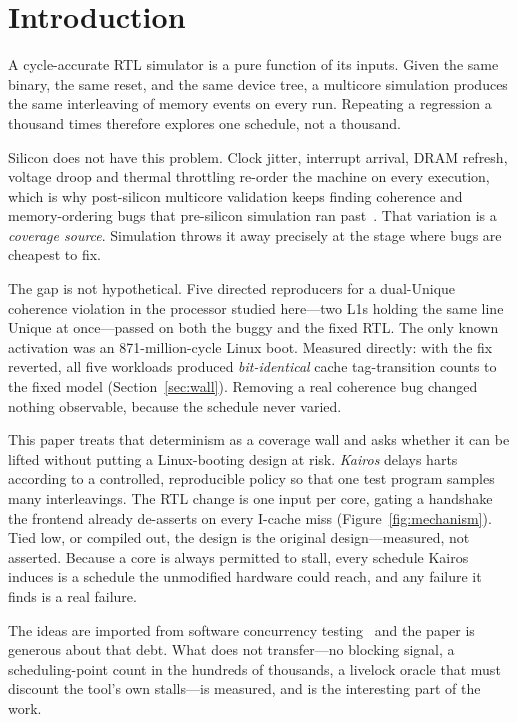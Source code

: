 \documentclass[sigconf,anonymous,review]{acmart}
\begin{document}
\maketitle

\section{Introduction}
\label{sec:intro}

A cycle-accurate RTL simulator is a pure function of its inputs. Given
the same binary, the same reset, and the same device tree, a multicore
simulation produces the same interleaving of memory events on every
run. Repeating a regression a thousand times therefore explores one
schedule, not a thousand.

Silicon does not have this problem. Clock jitter, interrupt arrival,
DRAM refresh, voltage droop and thermal throttling re-order the machine
on every execution, which is why post-silicon multicore validation
keeps finding coherence and memory-ordering bugs that pre-silicon
simulation ran past~\cite{hangal2004tsotool,lee2017mtracecheck}. That
variation is a \emph{coverage source}. Simulation throws it away
precisely at the stage where bugs are cheapest to fix.

The gap is not hypothetical. Five directed reproducers for a dual-Unique
coherence violation in the processor studied here---two L1s holding the
same line Unique at once---passed on both the buggy and the fixed RTL.
The only known activation was an 871-million-cycle Linux boot. Measured
directly: with the fix reverted, all five workloads produced
\emph{bit-identical} cache tag-transition counts to the fixed model
(Section~\ref{sec:wall}). Removing a real coherence bug changed
nothing observable, because the schedule never varied.

This paper treats that determinism as a coverage wall and asks whether
it can be lifted without putting a Linux-booting design at risk.
\emph{Kairos} delays harts according to a controlled, reproducible
policy so that one test program samples many interleavings. The RTL
change is one input per core, gating a handshake the frontend already
de-asserts on every I-cache miss (Figure~\ref{fig:mechanism}). Tied low, or
compiled out, the design is the original design---measured, not
asserted. Because a core is always permitted to stall, every schedule
Kairos induces is a schedule the unmodified hardware could reach, and
any failure it finds is a real failure.

The ideas are imported from software concurrency
testing~\cite{musuvathi2007chess,musuvathi2008chess,burckhardt2010pct}
and the paper is generous about that debt. What does not transfer---no
blocking signal, a scheduling-point count in the hundreds of thousands,
a livelock oracle that must discount the tool's own stalls---is
measured, and is the interesting part of the work.
\end{document}
